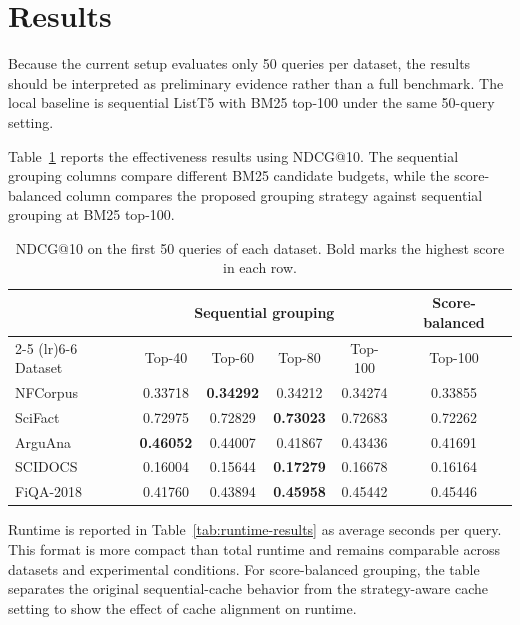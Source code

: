 \section{Results}

Because the current setup evaluates only 50 queries per dataset, the results should be interpreted as preliminary evidence rather than a full benchmark. The local baseline is sequential ListT5 with BM25 top-100 under the same 50-query setting.

Table~\ref{tab:ndcg-results} reports the effectiveness results using NDCG@10. The sequential grouping columns compare different BM25 candidate budgets, while the score-balanced column compares the proposed grouping strategy against sequential grouping at BM25 top-100.

\begin{table}[t]
  \centering
  \begin{tabular}{lccccc}
    \toprule
    & \multicolumn{4}{c}{Sequential grouping} & \multicolumn{1}{c}{Score-balanced} \\
    \cmidrule(lr){2-5} \cmidrule(lr){6-6}
    Dataset & Top-40 & Top-60 & Top-80 & Top-100 & Top-100 \\
    \midrule
    NFCorpus & 0.33718 & \textbf{0.34292} & 0.34212 & 0.34274 & 0.33855 \\
    SciFact & 0.72975 & 0.72829 & \textbf{0.73023} & 0.72683 & 0.72262 \\
    ArguAna & \textbf{0.46052} & 0.44007 & 0.41867 & 0.43436 & 0.41691 \\
    SCIDOCS & 0.16004 & 0.15644 & \textbf{0.17279} & 0.16678 & 0.16164 \\
    FiQA-2018 & 0.41760 & 0.43894 & \textbf{0.45958} & 0.45442 & 0.45446 \\
    \bottomrule
  \end{tabular}
  \caption{NDCG@10 on the first 50 queries of each dataset. Bold marks the highest score in each row.}
  \label{tab:ndcg-results}
\end{table}

Runtime is reported in Table~\ref{tab:runtime-results} as average seconds per query. This format is more compact than total runtime and remains comparable across datasets and experimental conditions. For score-balanced grouping, the table separates the original sequential-cache behavior from the strategy-aware cache setting to show the effect of cache alignment on runtime.

